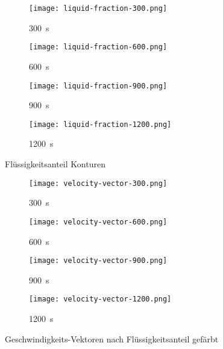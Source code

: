 \begin{figure}[H]
    \centering

    \begin{minipage}{0.485\textwidth}
        \centering
        \setlength{\tabcolsep}{1pt} %
        \begin{subfigure}{0.24\textwidth}
            \centering
            \texttt{[image: liquid-fraction-300.png]}
            \caption{\SI{300}{\second}}
        \end{subfigure}%
        \begin{subfigure}{0.24\textwidth}
            \centering
            \texttt{[image: liquid-fraction-600.png]}
            \caption{\SI{600}{\second}}
        \end{subfigure}%
        \begin{subfigure}{0.24\textwidth}
            \centering
            \texttt{[image: liquid-fraction-900.png]}
            \caption{\SI{900}{\second}}
        \end{subfigure}%
        \begin{subfigure}{0.24\textwidth}
            \centering
            \texttt{[image: liquid-fraction-1200.png]}
            \caption{\SI{1200}{\second}}
        \end{subfigure}
        \caption{Flüssigkeitsanteil Konturen}
        \label{fig:liquid_frac_contour}
    \end{minipage}
    \hspace{2mm} %
    \begin{minipage}{0.485\textwidth}
        \centering
        \begin{subfigure}{0.24\textwidth}
            \centering
            \texttt{[image: velocity-vector-300.png]}
            \caption{\SI{300}{\second}}
        \end{subfigure}%
        \begin{subfigure}{0.24\textwidth}
            \centering
            \texttt{[image: velocity-vector-600.png]}
            \caption{\SI{600}{\second}}
        \end{subfigure}%
        \begin{subfigure}{0.24\textwidth}
            \centering
            \texttt{[image: velocity-vector-900.png]}
            \caption{\SI{900}{\second}}
        \end{subfigure}%
        \begin{subfigure}{0.24\textwidth}
            \centering
            \texttt{[image: velocity-vector-1200.png]}
            \caption{\SI{1200}{\second}}
        \end{subfigure}
        \caption{Geschwindigkeits-Vektoren nach Flüssigkeitsanteil gefärbt}
        \label{fig:velocity_vector}
    \end{minipage}

\end{figure}